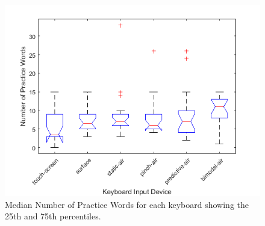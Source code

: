 \begin{figure}[t]
	\centering
	\includegraphics{Figures/fig_num_practice_boxplot}
	\caption[Number of Practice Words Boxplot]{Median Number of Practice Words for each keyboard showing the 25th and 75th percentiles.}
	\label{fig_num_practice_boxplot}
\end{figure}

